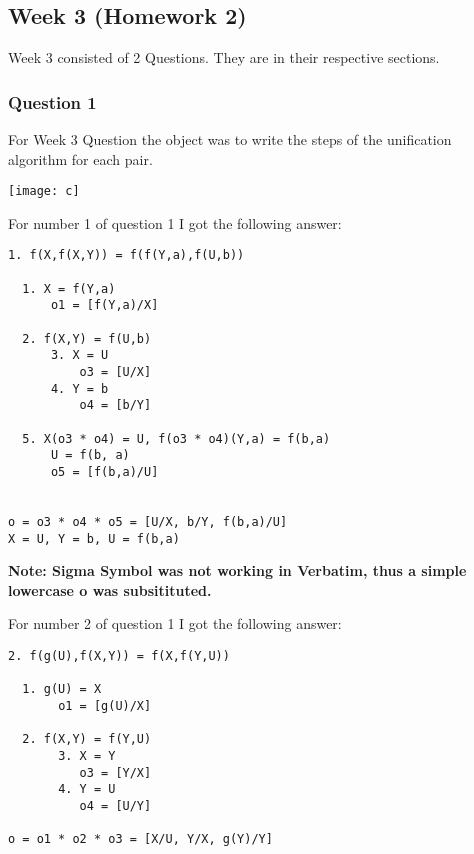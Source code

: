 \documentclass{article}
\theoremstyle{theorem}
\theoremstyle{definition}
\theoremstyle{remark}
\begin{document}
\subsection{Week 3 (Homework 2)}
\noindent Week 3 consisted of 2 Questions. They are in their respective sections.\newline

\subsubsection{Question 1}
For Week 3 Question the object was to write the steps of the unification algorithm for each pair. \newline

\texttt{[image: c]}\noindent\newline

\noindent\newline For number 1 of question 1 I got the following answer:

\begin{verbatim}
1. f(X,f(X,Y)) = f(f(Y,a),f(U,b))

  1. X = f(Y,a)
      o1 = [f(Y,a)/X]

  2. f(X,Y) = f(U,b)
      3. X = U
          o3 = [U/X]
      4. Y = b
          o4 = [b/Y]

  5. X(o3 * o4) = U, f(o3 * o4)(Y,a) = f(b,a)
      U = f(b, a)
      o5 = [f(b,a)/U]


o = o3 * o4 * o5 = [U/X, b/Y, f(b,a)/U]
X = U, Y = b, U = f(b,a)
\end{verbatim}

\noindent\textbf{Note: Sigma Symbol was not working in Verbatim, thus a simple lowercase o was subsitituted.}

\noindent\newline\newline For number 2 of question 1 I got the following answer:

\begin{verbatim}
2. f(g(U),f(X,Y)) = f(X,f(Y,U))

  1. g(U) = X
       o1 = [g(U)/X]

  2. f(X,Y) = f(Y,U)
       3. X = Y
          o3 = [Y/X]
       4. Y = U
          o4 = [U/Y]

o = o1 * o2 * o3 = [X/U, Y/X, g(Y)/Y]
\end{verbatim}
\end{document}

